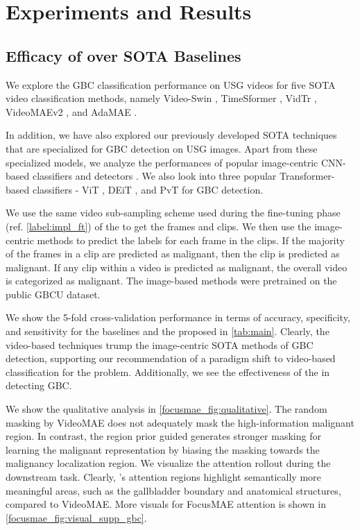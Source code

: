 \section{Experiments and Results}
%
\subsection{Efficacy of \focusmae over SOTA Baselines}
%
We explore the GBC classification performance on USG videos for five SOTA video classification methods, namely Video-Swin \cite{videoswin}, TimeSformer \cite{timesformer}, VidTr \cite{vidtr}, VideoMAEv2 \cite{videomaev2}, and AdaMAE \cite{adamae}. 

In addition, we have also explored our previously developed SOTA techniques \cite{basu2022surpassing, basu2023radformer, basu2022unsupervised} that are specialized for GBC detection on USG images. Apart from these specialized models, we analyze the performances of popular image-centric CNN-based classifiers \cite{resnet,inception} and detectors \cite{fasterrcnn, efficientdet}. We also look into three popular Transformer-based classifiers - ViT \cite{vit}, DEiT \cite{touvron2021training}, and PvT \cite{wang2021pvtv2} for GBC detection. 


%
We use the same video sub-sampling scheme used during the fine-tuning phase (ref. \cref{label:impl_ft}) of the \focusmae to get the frames and clips. We then use the image-centric methods to predict the labels for each frame in the clips. If the majority of the frames in a clip are predicted as malignant, then the clip is predicted as malignant. If any clip within a video is predicted as malignant, the overall video is categorized as malignant. The image-based methods were pretrained on the public GBCU \cite{basu2022surpassing} dataset. 

%
We show the 5-fold cross-validation performance in terms of accuracy, specificity, and sensitivity for the baselines and the proposed \focusmae in \cref{tab:main}. Clearly, the video-based techniques trump the image-centric SOTA methods of GBC detection, supporting our recommendation of a paradigm shift to video-based classification for the problem. Additionally, we see the effectiveness of the \focusmae in detecting GBC. 


%
We show the qualitative analysis in \cref{focusmae_fig:qualitative}. The random masking by VideoMAE does not adequately mask the high-information malignant region. In contrast, the region prior guided \focusmae generates stronger masking for learning the malignant representation by biasing the masking towards the malignancy localization region. We visualize the attention rollout during the downstream task. Clearly, \focusmae's attention regions highlight semantically more meaningful areas, such as the gallbladder boundary and anatomical structures, compared to VideoMAE. More visuals for FocusMAE attention is shown in \cref{focusmae_fig:visual_supp_gbc}.


